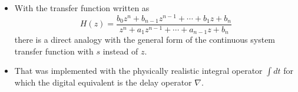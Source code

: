 \begin{itemize}
\item With the transfer function written as
\[H(z) = \frac{b_0 z^n + b_{n-1} z^{n-1} + \cdots + b_1 z + b_n}{z^n + a_1 z^{n-1} + \cdots + a_{n-1} z + b_n}\]
there is a direct analogy with the general form of the continuous
system transfer function with $s$ instead of $z$. \item That was
implemented with the physically realistic integral operator $\int
dt$ for which the digital equivalent is the delay operator
$\nabla$.
\end{itemize}
\endinput
